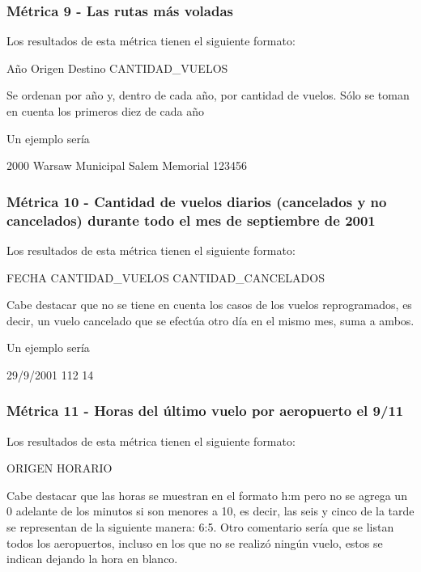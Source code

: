 \documentclass[a4paper,10pt]{article}
\begin{document}
 \subsubsection{Métrica 9 - Las rutas más voladas}
            Los resultados de esta métrica tienen el siguiente formato:\\
            \begin{center}
                Año Origen Destino CANTIDAD\_VUELOS
            \end{center}
            Se ordenan por año y, dentro de cada año, por cantidad de vuelos. Sólo se toman en cuenta los primeros diez de cada año

            Un ejemplo sería\\
            \begin{center}
                2000  Warsaw Municipal  Salem Memorial  123456\\
            \end{center}

 \subsubsection{Métrica 10 - Cantidad de vuelos diarios (cancelados y no cancelados) durante todo el mes de septiembre de 2001}
            Los resultados de esta métrica tienen el siguiente formato:\\
            \begin{center}
                FECHA CANTIDAD\_VUELOS  CANTIDAD\_CANCELADOS
            \end{center}
            Cabe destacar que no se tiene en cuenta los casos de los vuelos reprogramados, es decir, un vuelo cancelado que se efectúa otro día en el mismo mes, suma a ambos.

            Un ejemplo sería\\
            \begin{center}
                29/9/2001  112  14\\
            \end{center}

 \subsubsection{Métrica 11 - Horas del último vuelo por aeropuerto el 9/11}
            Los resultados de esta métrica tienen el siguiente formato:\\
            \begin{center}
                ORIGEN HORARIO
            \end{center}
            Cabe destacar que las horas se muestran en el formato h:m pero no se agrega un 0 adelante de los minutos si son menores a 10, es decir, las seis y cinco de la tarde se representan de la siguiente manera: 6:5. Otro comentario sería que se listan todos los aeropuertos, incluso en los que no se realizó ningún vuelo, estos se indican dejando la hora en blanco.
\end{document}
